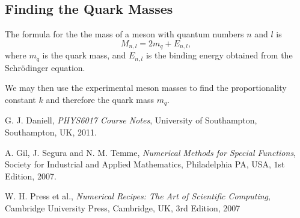 \documentclass[]{article}
\begin{document}
\subsection{Finding the Quark Masses}

The formula for the the mass of a meson with quantum numbers $n$ and $l$ is $$M_{n,l} = 2m_{q} + E_{n,l},$$ where $m_{q}$ is the quark mass, and $E_{n,l}$ is the binding energy obtained from the Schr\"{o}dinger equation.

We may then use the experimental meson masses to find the  proportionality constant $k$ and therefore the quark mass $m_{q}$.

\begin{table}[H]
	\begin{center}
		\quad %
		\caption{Meson Masses in \GeV.}
		\label{tab:mesonmasses}
	\end{center}  
\end{table}

\begin{thebibliography}{9}
  G. J. Daniell,
  \emph{PHYS6017 Course Notes},
  University of Southampton, Southampton, UK,
  2011.
  
  A. Gil, J. Segura and N. M. Temme,
  \emph{Numerical Methods for Special Functions},
  Society for Industrial and Applied Mathematics, Philadelphia PA, USA,
  $1$st Edition,
  2007.
  
  W. H. Press et al.,
  \emph{Numerical Recipes: The Art of Scientific Computing},
  Cambridge University Press, Cambridge, UK,
  $3$rd Edition,
  2007
  
\end{thebibliography}
\end{document}
